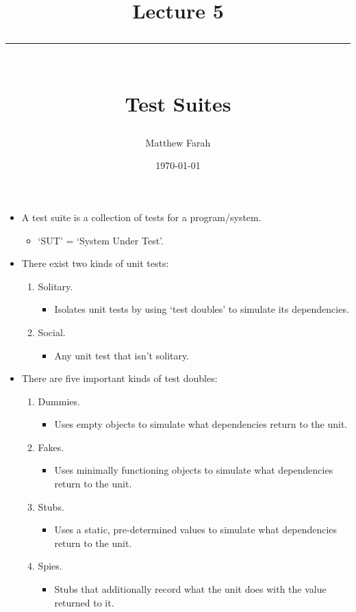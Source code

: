 \documentclass{article}
\date{
	\vspace{-.75em}
	{\large \today}
}
\title{
	\vspace*{-1.5em}
	{\Huge Lecture 5} \\
	\vspace{-1em}
	\rule{\textwidth/4}{.01em} \\
	\vspace{-.25em}
	{\Large Test Suites}
	\vspace{-.75em}
}
\author{
	{\large Matthew Farah}
}
\begin{document}
\maketitle
\pagestyle{fancy}

\fi

\begin{itemize}
	\item A test suite is a collection of tests for a program/system.
	\begin{itemize}
		\item `SUT' = `System Under Test'.
	\end{itemize}
	\item There exist two kinds of unit tests:
	\begin{enumerate}
		\item Solitary.
		\begin{itemize}
			\item Isolates unit tests by using `test doubles' to simulate its dependencies.
		\end{itemize}
		\item Social.
		\begin{itemize}
			\item Any unit test that isn't solitary.
		\end{itemize}
	\end{enumerate}
	\item There are five important kinds of test doubles:
	\begin{enumerate}
		\item Dummies.
		\begin{itemize}
			\item Uses empty objects to simulate what dependencies return to the unit.
		\end{itemize}
		\item Fakes.
		\begin{itemize}
			\item Uses minimally functioning objects to simulate what dependencies return to the unit.
		\end{itemize}
		\item Stubs.
		\begin{itemize}
			\item Uses a static, pre-determined values to simulate what dependencies return to the unit.
		\end{itemize}
		\item Spies.
		\begin{itemize}
			\item Stubs that additionally record what the unit does with the value returned to it.

\end{itemize}
\end{enumerate}
\end{itemize}
\end{document}
